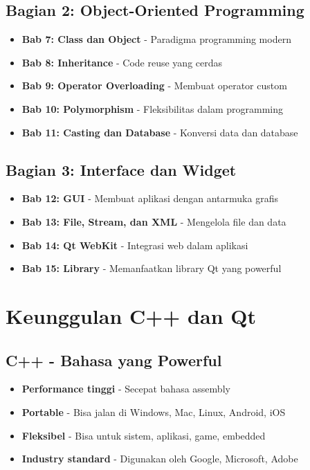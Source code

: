 \subsection*{Bagian 2: Object-Oriented Programming}
\begin{itemize}
\item \textbf{Bab 7: Class dan Object} - Paradigma programming modern
\item \textbf{Bab 8: Inheritance} - Code reuse yang cerdas
\item \textbf{Bab 9: Operator Overloading} - Membuat operator custom
\item \textbf{Bab 10: Polymorphism} - Fleksibilitas dalam programming
\item \textbf{Bab 11: Casting dan Database} - Konversi data dan database
\end{itemize}

\subsection*{Bagian 3: Interface dan Widget}
\begin{itemize}
\item \textbf{Bab 12: GUI} - Membuat aplikasi dengan antarmuka grafis
\item \textbf{Bab 13: File, Stream, dan XML} - Mengelola file dan data
\item \textbf{Bab 14: Qt WebKit} - Integrasi web dalam aplikasi
\item \textbf{Bab 15: Library} - Memanfaatkan library Qt yang powerful
\end{itemize}

\section*{Keunggulan C++ dan Qt}

\subsection*{C++ - Bahasa yang Powerful}
\begin{itemize}
\item \textbf{Performance tinggi} - Secepat bahasa assembly
\item \textbf{Portable} - Bisa jalan di Windows, Mac, Linux, Android, iOS
\item \textbf{Fleksibel} - Bisa untuk sistem, aplikasi, game, embedded
\item \textbf{Industry standard} - Digunakan oleh Google, Microsoft, Adobe
\end{itemize}

